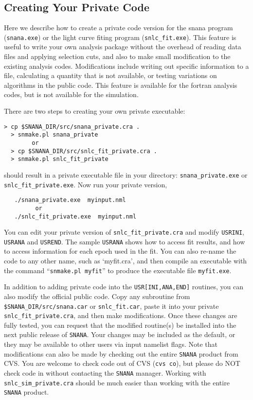 \documentclass[12pt]{article}
\begin{document}
   \subsection{Creating Your Private Code }
   \label{subsec:private_fitter}

Here we describe how to create a private code version for
the snana program ({\tt snana.exe}) or the light curve fiting
program ({\tt snlc\_fit.exe}). This feature is useful to write your
own analysis package without the overhead of 
reading data files and applying selection cuts,
and also to make small modification to the existing analysis codes.
Modifications include writing out specific information to a file, 
calculating a quantity that is not available,
or testing variations on algorithms in the public code.
This feature is available for the fortran analysis codes,
but is not available for the simulation.

There are two steps to creating your own private executable:
%
\begin{Verbatim}[frame=single]
  > cp $SNANA_DIR/src/snana_private.cra .
  > snmake.pl snana_private
        or
  > cp $SNANA_DIR/src/snlc_fit_private.cra .
  > snmake.pl snlc_fit_private
\end{Verbatim}
%
should result in a private executable file in your directory:
{\tt snana\_private.exe} or {\tt snlc\_fit\_private.exe}.
Now run your private version, 
%
\begin{verbatim}
   ./snana_private.exe  myinput.nml
         or
   ./snlc_fit_private.exe  myinput.nml
\end{verbatim}
%
You can edit your private version of {\tt snlc\_fit\_private.cra}
and modify {\tt USRINI}, {\tt USRANA} and {\tt USREND}.
The sample {\tt USRANA} shows how to access fit results,
and how to access information for each epoch used in
the fit.
You can also re-name the code to any other name, 
such as `myfit.cra', and then compile an executable
with the command ``{\tt snmake.pl myfit}'' to produce
the executable file {\tt myfit.exe}.


In addition to adding private code into the {\tt USR[INI,ANA,END]}
routines, you can also modify the official public code. 
Copy any subroutine from {\tt \$SNANA\_DIR/src/snana.car} or 
{\tt snlc\_fit.car},
paste it into your private {\tt snlc\_fit\_private.cra},
and then make modifications. Once these changes are fully tested,
you can request that the modified routine(s) be installed into
the next public release of {\tt SNANA}. Your changes may be
included as the default, or they may be available to other 
users via input namelist flags.
Note that modifications can also be made by checking out
the entire {\tt SNANA} product from CVS.
You are welcome to check code out of CVS ({\tt cvs co}),
but please do NOT check code in without contacting
the {\tt SNANA} manager.  Working with {\tt snlc\_sim\_private.cra}
should be much easier than working with the entire {\tt SNANA} product.
\end{document}
